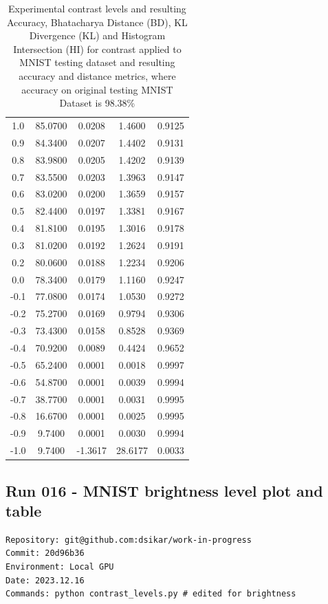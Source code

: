 \begin{table}[ht]
\begin{tabular}{|c|c|c|c|c|}
1.0 & 85.0700 & 0.0208 & 1.4600 & 0.9125 \\
0.9 & 84.3400 & 0.0207 & 1.4402 & 0.9131 \\
0.8 & 83.9800 & 0.0205 & 1.4202 & 0.9139 \\
0.7 & 83.5500 & 0.0203 & 1.3963 & 0.9147 \\
0.6 & 83.0200 & 0.0200 & 1.3659 & 0.9157 \\
0.5 & 82.4400 & 0.0197 & 1.3381 & 0.9167 \\
0.4 & 81.8100 & 0.0195 & 1.3016 & 0.9178 \\
0.3 & 81.0200 & 0.0192 & 1.2624 & 0.9191 \\
0.2 & 80.0600 & 0.0188 & 1.2234 & 0.9206 \\
0.0 & 78.3400 & 0.0179 & 1.1160 & 0.9247 \\
-0.1 & 77.0800 & 0.0174 & 1.0530 & 0.9272 \\
-0.2 & 75.2700 & 0.0169 & 0.9794 & 0.9306 \\
-0.3 & 73.4300 & 0.0158 & 0.8528 & 0.9369 \\
-0.4 & 70.9200 & 0.0089 & 0.4424 & 0.9652 \\
-0.5 & 65.2400 & 0.0001 & 0.0018 & 0.9997 \\
-0.6 & 54.8700 & 0.0001 & 0.0039 & 0.9994 \\
-0.7 & 38.7700 & 0.0001 & 0.0031 & 0.9995 \\
-0.8 & 16.6700 & 0.0001 & 0.0025 & 0.9995 \\
-0.9 & 9.7400 & 0.0001 & 0.0030 & 0.9994 \\
-1.0 & 9.7400 & -1.3617 & 28.6177 & 0.0033 \\

\hline
\end{tabular}
\caption{Experimental contrast levels and resulting Accuracy, Bhatacharya Distance (BD), KL Divergence (KL) and Histogram Intersection (HI) for contrast applied to MNIST testing dataset and resulting accuracy and distance metrics, where accuracy on original testing MNIST Dataset is 98.38\%}
\label{your-label-here}
\end{table}

\subsection{Run 016 - MNIST brightness level plot and table}
\label{app_res:016}
\begin{verbatim}
Repository: git@github.com:dsikar/work-in-progress
Commit: 20d96b36
Environment: Local GPU
Date: 2023.12.16
Commands: python contrast_levels.py # edited for brightness
\end{verbatim}

